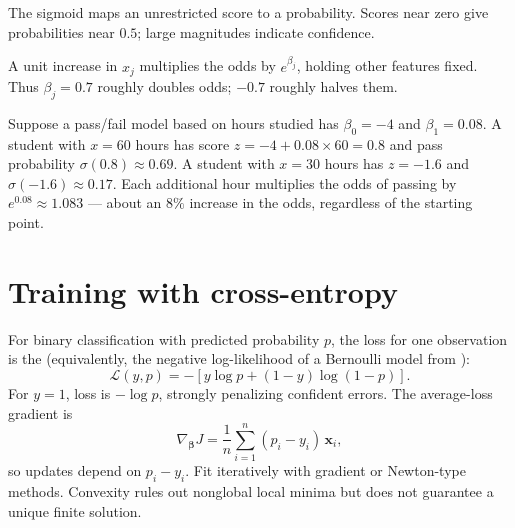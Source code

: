 \begin{mlfigure}
\end{mlfigure}

\begin{intuition}
The sigmoid maps an unrestricted score to a probability. Scores near zero give probabilities near $0.5$; large magnitudes indicate confidence.
\end{intuition}

A unit increase in $x_j$ multiplies the odds by $e^{\beta_j}$, holding other features fixed. Thus $\beta_j=0.7$ roughly doubles odds; $-0.7$ roughly halves them.

\begin{workedexample}
Suppose a pass/fail model based on hours studied has $\beta_0=-4$ and $\beta_1=0.08$.
A student with $x=60$ hours has score $z=-4+0.08\times 60=0.8$ and pass probability $\sigma(0.8)\approx 0.69$.
A student with $x=30$ hours has $z=-1.6$ and $\sigma(-1.6)\approx 0.17$.
Each additional hour multiplies the odds of passing by $e^{0.08}\approx 1.083$ --- about an $8\%$ increase in the odds, regardless of the starting point.
\end{workedexample}

\section{Training with cross-entropy}

For binary classification with predicted probability $p$, the loss for one observation is the  (equivalently, the negative log-likelihood of a Bernoulli model from ):
\[
  \mathcal{L}(y,p)
  =-[y\log p+(1-y)\log(1-p)].
\]
For $y=1$, loss is $-\log p$, strongly penalizing confident errors. The average-loss gradient is
\[
  \nabla_{\bm{\beta}}J
  =\frac{1}{n}\sum_{i=1}^{n}(p_i-y_i)\,\bm{x}_i,
\]
so updates depend on $p_i-y_i$. Fit iteratively with gradient or Newton-type methods. Convexity rules out nonglobal local minima but does not guarantee a unique finite solution.

